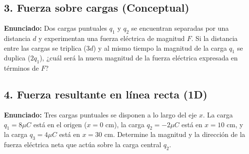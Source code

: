 \documentclass[12pt, letterpaper]{article}
\begin{document}
\subsection*{3. Fuerza sobre cargas (Conceptual)}
\noindent \textbf{Enunciado:} Dos cargas puntuales $q_1$ y $q_2$ se encuentran separadas por una distancia $d$ y experimentan una fuerza eléctrica de magnitud $F$. Si la distancia entre las cargas se triplica ($3d$) y al mismo tiempo la magnitud de la carga $q_1$ se duplica ($2q_1$), ¿cuál será la nueva magnitud de la fuerza eléctrica expresada en términos de $F$?


\subsection*{4. Fuerza resultante en línea recta (1D)}
\noindent \textbf{Enunciado:} Tres cargas puntuales se disponen a lo largo del eje $x$. La carga $q_1 = 8 \mu C$ está en el origen ($x = 0 \text{ cm}$), la carga $q_2 = -2 \mu C$ está en $x = 10 \text{ cm}$, y la carga $q_3 = 4 \mu C$ está en $x = 30 \text{ cm}$. Determine la magnitud y la dirección de la fuerza eléctrica neta que actúa sobre la carga central $q_2$.
\end{document}
